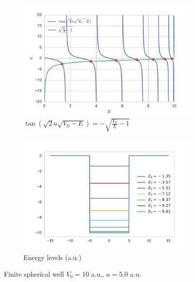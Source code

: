 \documentclass[a4paper, 14pt]{article}
\begin{document}
\begin{figure}[h!]
\centering
\begin{subfigure}{.5\textwidth}
  \centering
  \includegraphics[width=1.0\linewidth]{tan-sqrt.pdf}
  \caption{$\tan(\sqrt{2} a \sqrt{V_0-E})=-\sqrt{\frac{V_0}{E}-1}$}
  \label{fig1:tan-sqrt}
\end{subfigure}%
\begin{subfigure}{.5\textwidth}
  \centering
  \includegraphics[width=1.0\linewidth]{ens_finite.pdf}
  \caption{Energy levels (a.u.)}
  \label{fig:finite_well_sol}
\end{subfigure}
\caption{Finite spherical well $V_0 = 10$ a.u., $a=5.0$ a.u.}
\label{fig:fin_well}
\end{figure}
\end{document}
